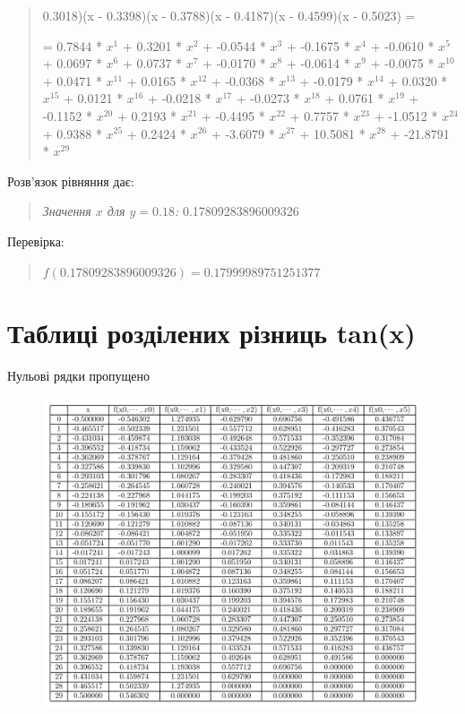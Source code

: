\documentclass[a4paper, 12pt]{article}
\begin{document}
\begin{quote}
0.3018)(x - 0.3398)(x - 0.3788)(x - 0.4187)(x - 0.4599)(x - 0.5023)
=

=
0.7844 * \( x^{1} \) + 0.3201 * \( x^{2} \) + -0.0544 * \( x^{3} \) + -0.1675 * \( x^{4} \) + -0.0610 * \( x^{5} \) + 0.0697 * \( x^{6} \) + 0.0737 * \( x^{7} \) + -0.0170 * \( x^{8} \) + -0.0614 * \( x^{9} \) + -0.0075 * \( x^{10} \) + 0.0471 * \( x^{11} \) + 0.0165 * \( x^{12} \) + -0.0368 * \( x^{13} \) + -0.0179 * \( x^{14} \) + 0.0320 * \( x^{15} \) + 0.0121 * \( x^{16} \) + -0.0218 * \( x^{17} \) + -0.0273 * \( x^{18} \) + 0.0761 * \( x^{19} \) + -0.1152 * \( x^{20} \) + 0.2193 * \( x^{21} \) + -0.4495 * \( x^{22} \) + 0.7757 * \( x^{23} \) + -1.0512 * \( x^{24} \) + 0.9388 * \( x^{25} \) + 0.2424 * \( x^{26} \) + -3.6079 * \( x^{27} \) + 10.5081 * \( x^{28} \) + -21.8791 * \( x^{29} \)
\end{quote}
Розв'язок рівняння дає:

\begin{quote}
\textit{Значення \( x \) для \( y = 0.18 \):} 0.17809283896009326
\end{quote}

Перевірка:

\begin{quote}
\( f(0.17809283896009326) = 0.17999989751251377 \)
\end{quote}

\clearpage
\newpage
\section{Таблиці розділених різниць tan(x)} \label{sec:table1}
Нульові рядки пропущено

\begin{figure}[ht]
	\centering
	\includegraphics[width=1\linewidth]{./img/t11.png}
\end{figure}
\end{document}
